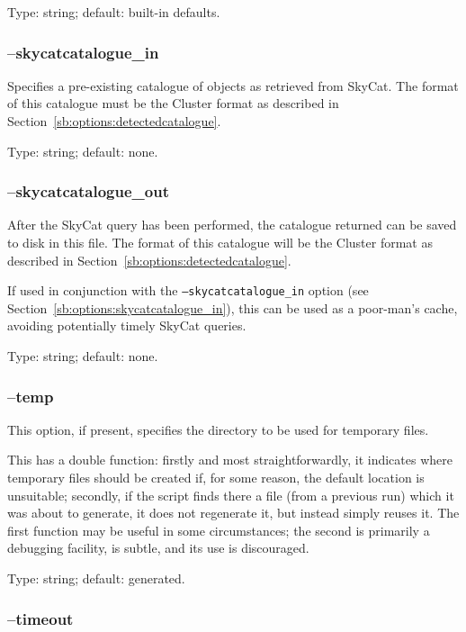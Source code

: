 \documentclass[twoside,11pt]{article}
\newcommand{\xlabel}[1]{}
\begin{document}
Type: string; default: built-in defaults.

\subsubsection{\xlabel{sb_options_skycatcatalogue_in}--skycatcatalogue\_in\label{sb:options:skycatcatalogue_in}}

Specifies a pre-existing catalogue of objects as retrieved from SkyCat. The
format of this catalogue must be the Cluster format as described in
Section~\ref{sb:options:detectedcatalogue}.

Type: string; default: none.

\subsubsection{\xlabel{sb_options_skycatcatalogue_out}--skycatcatalogue\_out\label{sb:options:skycatalogue_out}}

After the SkyCat query has been performed, the catalogue returned can be saved
to disk in this file. The format of this catalogue will be the Cluster format
as described in Section~\ref{sb:options:detectedcatalogue}.

If used in conjunction with the \texttt{--skycatcatalogue\_in} option (see
Section~\ref{sb:options:skycatcatalogue_in}), this can be used as a poor-man's
cache, avoiding potentially timely SkyCat queries.

Type: string; default: none.

\subsubsection{\xlabel{sb_options_temp}--temp\label{sb:options:temp}}

This option, if present, specifies the directory to be used for temporary
files.

This has a double function: firstly and most straightforwardly, it indicates
where temporary files should be created if, for some reason, the default
location is unsuitable; secondly, if the script finds there a file (from a
previous run) which it was about to generate, it does not regenerate it, but
instead simply reuses it.  The first function may be useful in some
circumstances; the second is primarily a debugging facility, is subtle, and
its use is discouraged.

Type: string; default: generated.

\subsubsection{\xlabel{sb_options_timeout}--timeout\label{sb:options:timeout}}
\end{document}
